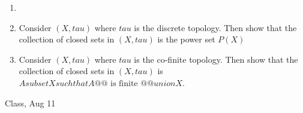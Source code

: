 \begin{samepage}
\begin{ex}
    \begin{enumerate}
        \item[]
        \item Consider $(X, tau)$ where $tau$ is the discrete topology. Then show that the collection of closed sets in $(X, tau)$ is the power set $P(X)$
        \item Consider $(X, tau)$ where $tau$ is the co-finite topology. Then show that the collection of closed sets in $(X, tau)$ is $ {{ A subset X such that A @@\text{ is finite }@@ }} union {{ X }} $.
    \end{enumerate}
\end{ex}
\begin{source}
Class, Aug 11
\end{source}
\end{samepage}

